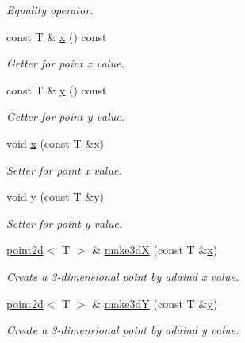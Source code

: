 \begin{DoxyCompactItemize}
\begin{DoxyCompactList}\small\item\em Equality operator. \end{DoxyCompactList}\item 
\mbox{\label{classacme_1_1point2d_aa62c36149dc319bcd38b351be5230f04}} 
const T \& \hyperlink{classacme_1_1point2d_aa62c36149dc319bcd38b351be5230f04}{x} () const
\begin{DoxyCompactList}\small\item\em Getter for point x value. \end{DoxyCompactList}\item 
\mbox{\label{classacme_1_1point2d_adf79b9f2fbcac2c5f1bea2bece0e9b27}} 
const T \& \hyperlink{classacme_1_1point2d_adf79b9f2fbcac2c5f1bea2bece0e9b27}{y} () const
\begin{DoxyCompactList}\small\item\em Getter for point y value. \end{DoxyCompactList}\item 
void \hyperlink{classacme_1_1point2d_a158797a6603451c35bd0e2be3be3b2c8}{x} (const T \&x)
\begin{DoxyCompactList}\small\item\em Setter for point x value. \end{DoxyCompactList}\item 
void \hyperlink{classacme_1_1point2d_ab1baab0e82e178f1e828a25fa8dbb1c8}{y} (const T \&y)
\begin{DoxyCompactList}\small\item\em Setter for point y value. \end{DoxyCompactList}\item 
\hyperlink{classacme_1_1point2d}{point2d}$<$ T $>$ \& \hyperlink{classacme_1_1point2d_a23948fcd0635557e8eeb0c298bb96f68}{make3dX} (const T \&\hyperlink{classacme_1_1point2d_aa62c36149dc319bcd38b351be5230f04}{x})
\begin{DoxyCompactList}\small\item\em Create a 3-\/dimensional point by addind x value. \end{DoxyCompactList}\item 
\hyperlink{classacme_1_1point2d}{point2d}$<$ T $>$ \& \hyperlink{classacme_1_1point2d_ac6bdbcec56da64ea0265691f3e734625}{make3dY} (const T \&\hyperlink{classacme_1_1point2d_adf79b9f2fbcac2c5f1bea2bece0e9b27}{y})
\begin{DoxyCompactList}\small\item\em Create a 3-\/dimensional point by addind y value. \end{DoxyCompactList}\item 

\end{DoxyCompactItemize}
